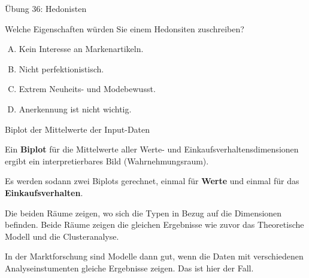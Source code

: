 \documentclass[12pt,ngerman,a4paper,ignorenonframetext,]{beamer}
\providecommand{\tightlist}{%
  \setlength{\itemsep}{0pt}\setlength{\parskip}{0pt}}
\begin{document}
\begin{frame}{Übung 36: Hedonisten}
\protect\hypertarget{ubung-36-hedonisten}{}

Welche Eigenschaften würden Sie einem Hedonsiten zuschreiben?

\begin{enumerate}
[A.]
\tightlist
\item
  Kein Interesse an Markenartikeln.
\item
  Nicht perfektionistisch.
\item
  Extrem Neuheits- und Modebewusst.
\item
  Anerkennung ist nicht wichtig.
\end{enumerate}


\end{frame}

\begin{frame}{Biplot der Mittelwerte der Input-Daten}
\protect\hypertarget{biplot-der-mittelwerte-der-input-daten}{}

Ein \textbf{Biplot} für die Mittelwerte aller Werte- und
Einkaufsverhaltensdimensionen ergibt ein interpretierbares Bild
(Wahrnehmungsraum).

Es werden sodann zwei Biplots gerechnet, einmal für \textbf{Werte} und
einmal für das \textbf{Einkaufsverhalten}.

Die beiden Räume zeigen, wo sich die Typen in Bezug auf die Dimensionen
befinden. Beide Räume zeigen die gleichen Ergebnisse wie zuvor das
Theoretische Modell und die Clusteranalyse.

In der Marktforschung sind Modelle dann gut, wenn die Daten mit
verschiedenen Analyseinstumenten gleiche Ergebnisse zeigen. Das ist hier
der Fall.

\end{frame}
\end{document}
